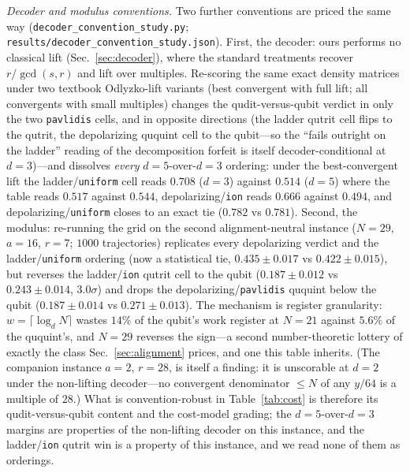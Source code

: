 \documentclass[aps,pra,reprint,superscriptaddress,nofootinbib,floatfix]{revtex4-2}
\begin{document}
\emph{Decoder and modulus conventions.} Two further conventions are
priced the same way (\texttt{decoder\_convention\_study.py};
\texttt{results/decoder\_convention\_study.json}). First, the
decoder: ours performs no classical lift
(Sec.~\ref{sec:decoder}), where the standard treatments recover
$r/\gcd(s,r)$ and lift over multiples. Re-scoring the same exact
density matrices under two textbook Odlyzko-lift variants (best
convergent with full lift; all convergents with small multiples)
changes the qudit-versus-qubit verdict in only the two
\texttt{pavlidis} cells, and in opposite directions (the ladder
qutrit cell flips to the qutrit, the depolarizing ququint cell to the
qubit---so the ``fails outright on the ladder'' reading of the
decomposition forfeit is itself decoder-conditional at $d=3$)---and
dissolves \emph{every} $d{=}5$-over-$d{=}3$ ordering: under the
best-convergent lift the ladder/\texttt{uniform} cell reads $0.708$
($d{=}3$) against $0.514$ ($d{=}5$) where the table reads $0.517$
against $0.544$, depolarizing/\texttt{ion} reads $0.666$ against
$0.494$, and depolarizing/\texttt{uniform} closes to an exact tie
($0.782$ vs $0.781$). Second, the modulus: re-running the grid on the
second alignment-neutral instance ($N=29$, $a=16$, $r=7$; $1000$
trajectories) replicates every depolarizing verdict and the
ladder/\texttt{uniform} ordering (now a statistical tie, $0.435\pm
0.017$ vs $0.422\pm0.015$), but reverses the ladder/\texttt{ion}
qutrit cell to the qubit ($0.187\pm0.012$ vs $0.243\pm0.014$,
$3.0\sigma$) and drops the depolarizing/\texttt{pavlidis} ququint
below the qubit ($0.187\pm0.014$ vs $0.271\pm0.013$). The mechanism
is register granularity: $w=\lceil\log_d N\rceil$ wastes $14\%$ of
the qubit's work register at $N=21$ against $5.6\%$ of the
ququint's, and $N=29$ reverses the sign---a second number-theoretic
lottery of exactly the class Sec.~\ref{sec:alignment} prices, and
one this table inherits. (The companion instance $a=2$, $r=28$, is
itself a finding: it is unscorable at $d=2$ under the non-lifting
decoder---no convergent denominator ${\le}N$ of any $y/64$ is a
multiple of $28$.) What is convention-robust in
Table~\ref{tab:cost} is therefore its qudit-versus-qubit content and
the cost-model grading; the $d{=}5$-over-$d{=}3$ margins are
properties of the non-lifting decoder on this instance, and the
ladder/\texttt{ion} qutrit win is a property of this instance, and
we read none of them as orderings.
\end{document}
